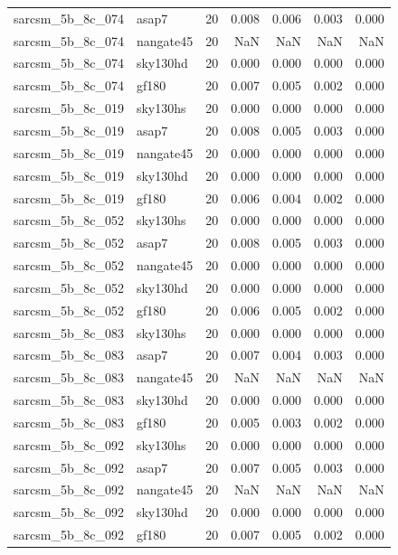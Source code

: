 \begin{tabular}{llrrrrr}
sarcsm\_5b\_8c\_074 & asap7 & 20 & 0.008 & 0.006 & 0.003 & 0.000 \\
sarcsm\_5b\_8c\_074 & nangate45 & 20 & NaN & NaN & NaN & NaN \\
sarcsm\_5b\_8c\_074 & sky130hd & 20 & 0.000 & 0.000 & 0.000 & 0.000 \\
sarcsm\_5b\_8c\_074 & gf180 & 20 & 0.007 & 0.005 & 0.002 & 0.000 \\
sarcsm\_5b\_8c\_019 & sky130hs & 20 & 0.000 & 0.000 & 0.000 & 0.000 \\
sarcsm\_5b\_8c\_019 & asap7 & 20 & 0.008 & 0.005 & 0.003 & 0.000 \\
sarcsm\_5b\_8c\_019 & nangate45 & 20 & 0.000 & 0.000 & 0.000 & 0.000 \\
sarcsm\_5b\_8c\_019 & sky130hd & 20 & 0.000 & 0.000 & 0.000 & 0.000 \\
sarcsm\_5b\_8c\_019 & gf180 & 20 & 0.006 & 0.004 & 0.002 & 0.000 \\
sarcsm\_5b\_8c\_052 & sky130hs & 20 & 0.000 & 0.000 & 0.000 & 0.000 \\
sarcsm\_5b\_8c\_052 & asap7 & 20 & 0.008 & 0.005 & 0.003 & 0.000 \\
sarcsm\_5b\_8c\_052 & nangate45 & 20 & 0.000 & 0.000 & 0.000 & 0.000 \\
sarcsm\_5b\_8c\_052 & sky130hd & 20 & 0.000 & 0.000 & 0.000 & 0.000 \\
sarcsm\_5b\_8c\_052 & gf180 & 20 & 0.006 & 0.005 & 0.002 & 0.000 \\
sarcsm\_5b\_8c\_083 & sky130hs & 20 & 0.000 & 0.000 & 0.000 & 0.000 \\
sarcsm\_5b\_8c\_083 & asap7 & 20 & 0.007 & 0.004 & 0.003 & 0.000 \\
sarcsm\_5b\_8c\_083 & nangate45 & 20 & NaN & NaN & NaN & NaN \\
sarcsm\_5b\_8c\_083 & sky130hd & 20 & 0.000 & 0.000 & 0.000 & 0.000 \\
sarcsm\_5b\_8c\_083 & gf180 & 20 & 0.005 & 0.003 & 0.002 & 0.000 \\
sarcsm\_5b\_8c\_092 & sky130hs & 20 & 0.000 & 0.000 & 0.000 & 0.000 \\
sarcsm\_5b\_8c\_092 & asap7 & 20 & 0.007 & 0.005 & 0.003 & 0.000 \\
sarcsm\_5b\_8c\_092 & nangate45 & 20 & NaN & NaN & NaN & NaN \\
sarcsm\_5b\_8c\_092 & sky130hd & 20 & 0.000 & 0.000 & 0.000 & 0.000 \\
sarcsm\_5b\_8c\_092 & gf180 & 20 & 0.007 & 0.005 & 0.002 & 0.000 \\

\end{tabular}
